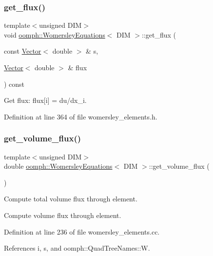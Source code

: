 \subsubsection{\texorpdfstring{get\+\_\+flux()}{get\_flux()}}
{\footnotesize\ttfamily template$<$unsigned D\+IM$>$ \\
void \hyperlink{classoomph_1_1WomersleyEquations}{oomph\+::\+Womersley\+Equations}$<$ D\+IM $>$\+::get\+\_\+flux (\begin{DoxyParamCaption}\item[{const \hyperlink{classoomph_1_1Vector}{Vector}$<$ double $>$ \&}]{s,  }\item[{\hyperlink{classoomph_1_1Vector}{Vector}$<$ double $>$ \&}]{flux }\end{DoxyParamCaption}) const\hspace{0.3cm}{\ttfamily [inline]}}



Get flux\+: flux\mbox{[}i\mbox{]} = du/dx\+\_\+i. 



Definition at line 364 of file womersley\+\_\+elements.\+h.

\mbox{\label{classoomph_1_1WomersleyEquations_ab04034e44e876ea9935a4ae102c34ce9}} 
\subsubsection{\texorpdfstring{get\+\_\+volume\+\_\+flux()}{get\_volume\_flux()}}
{\footnotesize\ttfamily template$<$unsigned D\+IM$>$ \\
double \hyperlink{classoomph_1_1WomersleyEquations}{oomph\+::\+Womersley\+Equations}$<$ D\+IM $>$\+::get\+\_\+volume\+\_\+flux (\begin{DoxyParamCaption}{ }\end{DoxyParamCaption})}



Compute total volume flux through element. 

Compute volume flux through element. 

Definition at line 236 of file womersley\+\_\+elements.\+cc.



References i, s, and oomph\+::\+Quad\+Tree\+Names\+::W.



